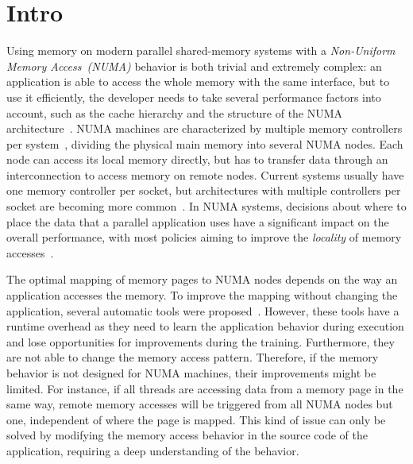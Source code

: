 
\section{Intro}
\label{sec:intro}

Using memory on modern parallel shared-memory systems with a \emph{Non-Uniform Memory Access~(NUMA)} behavior is both trivial and extremely complex: an application is able to access the whole memory with the same interface, but to use it efficiently, the developer needs to take several performance factors into account, such as the cache hierarchy and the structure of the NUMA architecture~\cite{Drepper07What}.
NUMA machines are characterized by multiple memory controllers per system~\cite{Awasthi2010}, dividing the physical main memory into several NUMA nodes.
Each node can access its local memory directly, but has to transfer data through an interconnection to access memory on remote nodes.
Current systems usually have one memory controller per socket, but architectures with multiple controllers per socket are becoming more common~\cite{AMD2012}.
In NUMA systems, decisions about where to place the data that a parallel application uses have a significant impact on the overall performance, with most policies aiming to improve the \emph{locality} of memory accesses~\cite{Diener2015}.

The optimal mapping of memory pages to NUMA nodes depends on the way an application accesses the memory.
To improve the mapping without changing the application, several automatic tools were proposed~\cite{Corbet2012,Corbet,Dashti2013,Diener2014,Piccoli2014}.
However, these tools have a runtime overhead as they need to learn the application behavior during execution and lose opportunities for improvements during the training.
Furthermore, they are not able to change the memory access pattern.
Therefore, if the memory behavior is not designed for NUMA machines, their improvements might be limited.
For instance, if all threads are accessing data from a memory
page in the same way, remote memory accesses will be triggered from all NUMA nodes but one, independent of where the page is mapped.
This kind of issue can only be solved by modifying the memory access behavior in the source code of the application, requiring a deep understanding of the behavior.

